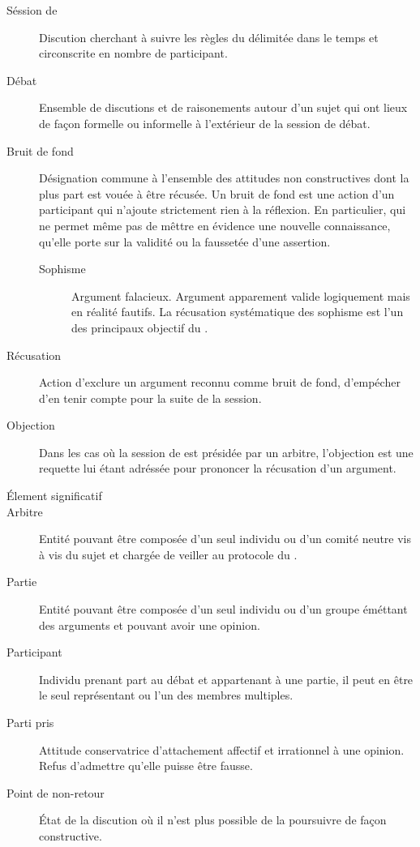 \begin{description}
  \item[Séssion de \mainabbr{}] Discution cherchant à suivre les règles du \mainabbr{} délimitée dans le temps et circonscrite en nombre de participant.
  \item[Débat] Ensemble de discutions et de raisonements autour d’un sujet qui ont lieux de façon formelle ou informelle à l’extérieur de la session de débat.
  \item[Bruit de fond] Désignation commune à l’ensemble des attitudes non constructives dont la plus part est vouée à être récusée. Un bruit de fond est une action d’un participant qui n’ajoute strictement rien à la réflexion. En particulier, qui ne permet même pas de mêttre en évidence une nouvelle connaissance, qu’elle porte sur la validité ou la faussetée d’une assertion.

    \begin{description}
      \item[Sophisme] Argument falacieux. Argument apparement valide logiquement mais en réalité fautifs. La récusation systématique des sophisme est l’un des principaux objectif du \mainabbr{}.
    \end{description}

  \item[Récusation] Action d’exclure un argument reconnu comme bruit de fond, d’empécher d’en tenir compte pour la suite de la session.
  \item[Objection] Dans les cas où la session de \mainabbr{} est présidée par un arbitre, l’objection est une requette lui étant adréssée pour prononcer la récusation d’un argument.
  \item[Élement significatif] 
  \item[Arbitre] Entité pouvant être composée d’un seul individu ou d’un comité neutre vis à vis du sujet et chargée de veiller au protocole du \mainabbr{}.
  \item[Partie] Entité pouvant être composée d’un seul individu ou d’un groupe éméttant des arguments et pouvant avoir une opinion.
  \item[Participant] Individu prenant part au débat et appartenant à une partie, il peut en être le seul représentant ou l’un des membres multiples.
  \item[Parti pris] Attitude conservatrice d’attachement affectif et irrationnel à une opinion. Refus d’admettre qu’elle puisse être fausse.
  \item[Point de non-retour] État de la discution où il n’est plus possible de la poursuivre de façon constructive.
\end{description}

